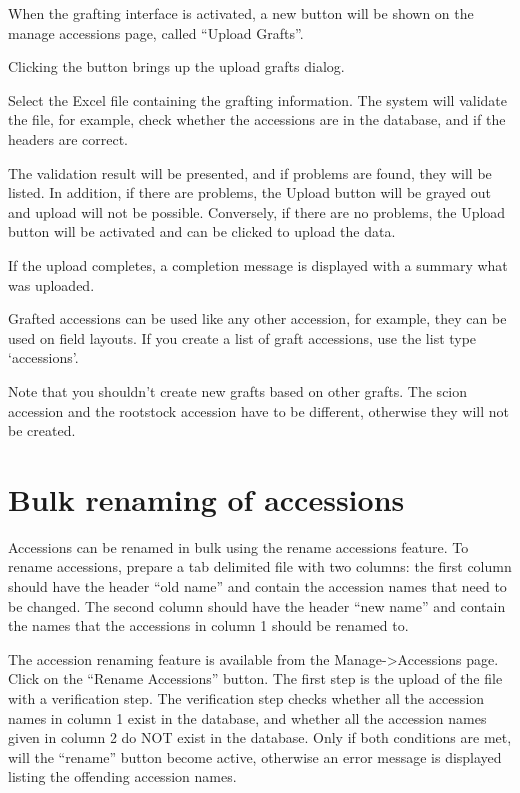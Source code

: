\documentclass[
  12pt,
]{book}
\begin{document}
When the grafting interface is activated, a new button will be shown on the manage accessions page, called ``Upload Grafts''.

Clicking the button brings up the upload grafts dialog.

Select the Excel file containing the grafting information. The system will validate the file, for example, check whether the accessions are in the database, and if the headers are correct.

The validation result will be presented, and if problems are found, they will be listed. In addition, if there are problems, the Upload button will be grayed out and upload will not be possible. Conversely, if there are no problems, the Upload button will be activated and can be clicked to upload the data.

If the upload completes, a completion message is displayed with a summary what was uploaded.

Grafted accessions can be used like any other accession, for example, they can be used on field layouts. If you create a list of graft accessions, use the list type `accessions'.

Note that you shouldn't create new grafts based on other grafts. The scion accession and the rootstock accession have to be different, otherwise they will not be created.

\hypertarget{bulk-renaming-of-accessions}{%
\section{Bulk renaming of accessions}\label{bulk-renaming-of-accessions}}

Accessions can be renamed in bulk using the rename accessions feature. To rename accessions, prepare a tab delimited file with two columns: the first column should have the header ``old name'' and contain the accession names that need to be changed. The second column should have the header ``new name'' and contain the names that the accessions in column 1 should be renamed to.

The accession renaming feature is available from the Manage-\textgreater Accessions page. Click on the ``Rename Accessions'' button. The first step is the upload of the file with a verification step. The verification step checks whether all the accession names in column 1 exist in the database, and whether all the accession names given in column 2 do NOT exist in the database. Only if both conditions are met, will the ``rename'' button become active, otherwise an error message is displayed listing the offending accession names.
\end{document}
